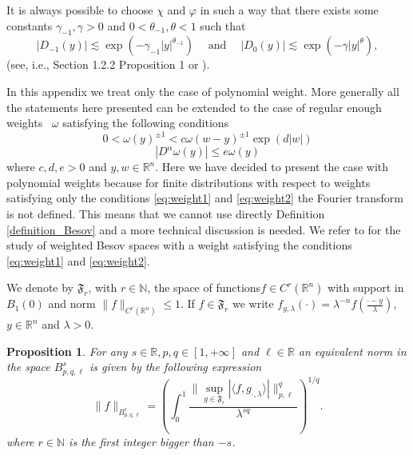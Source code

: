 \documentclass[a4paper,10pt]{article}
\newcommand{\tmop}[1]{\ensuremath{\operatorname{#1}}}
\newtheorem{proposition}[theorem]{Proposition}
{\theorembodyfont{\rmfamily}\newtheorem{remark}[theorem]{Remark}}
\begin{document}
\begin{remark}
  \label{remark_decay}It is always possible to choose $\chi$ and $\varphi$ in
  such a way that there exists some constants $\gamma_{- 1}, \gamma > 0$ and
  $0 < \theta_{- 1}, \theta < 1$ such that
  \[ | D_{- 1} (y) | \lesssim \exp (- \gamma_{- 1} | y |^{\theta_{- 1}})
     \quad \tmop{and} \quad | D_0 (y) | \lesssim \exp (- \gamma | y
     |^{\theta}), \]
  (see, i.e., {\cite{SchmeisserTriebel}} Section 1.2.2 Proposition 1 or
  {\cite{MW17}}).
\end{remark}

\begin{remark}
  \label{remark_weight}In this appendix we treat only the case of polynomial
  weight. More generally all the statements here presented can be extended to
  the case of regular enough weights \ $\omega$ satisfying the following
  conditions
  \begin{equation}
    0 < \omega (y)^{\pm 1} < c \omega (w - y)^{\pm 1} \exp (d | w |)
    \label{eq:weight1}
  \end{equation}
  \begin{equation}
    | D^{\alpha} \omega (y) | \leqslant e \omega (y) \label{eq:weight2}
  \end{equation}
  where $c, d, e > 0$ and $y, w \in \mathbb{R}^n$. Here we have decided to
  present the case with polynomial weights because for finite distributions
  with respect to weights satisfying only the conditions {\eqref{eq:weight1}}
  and {\eqref{eq:weight2}} the Fourier transform is not defined. This means
  that we cannot use directly Definition \ref{definition_Besov} and a more
  technical discussion is needed. We refer to {\cite{Schott1,Schott2}} for the
  study of weighted Besov spaces with a weight satisfying the conditions
  {\eqref{eq:weight1}} and {\eqref{eq:weight2}}.
\end{remark}

We denote by $\mathfrak{F}_r$, with $r \in \mathbb{N}$, the space of
functions$f \in C^r (\mathbb{R}^n)$ with support in $B_1 (0)$ and norm $\| f
\|_{\mathfrak{} C^r (\mathbb{R}^n)} \leq 1$. If $f \in \mathfrak{F}_r$ we
write $f_{y, \lambda} (\cdot) = \lambda^{- n} f \left( \frac{\cdot -
y}{\lambda} \right)$, $y \in \mathbb{R}^n$ and $\lambda > 0$. \

\begin{proposition}
  \label{proposition_equivalentnorm}For any $s \in \mathbb{R}, p, q \in [1, +
  \infty]$ and $\ell \in \mathbb{R}$ an equivalent norm in the space $B^s_{p,
  q, \ell}$ is given by the following expression
  \begin{equation}
    \| f \|_{B^s_{p, q, \ell}} = \left( \int_0^1 \frac{\| \sup_{g \in
    \mathfrak{F}_r} | \langle f, g_{\cdot, \lambda} \rangle | \|_{p,
    \ell}^q}{\lambda^{s q}} \right)^{1 / q} . \label{eq:equivalentnorm}
  \end{equation}
  where $r \in \mathbb{N}$ is the first integer bigger than $- s$.
\end{proposition}
\end{document}
